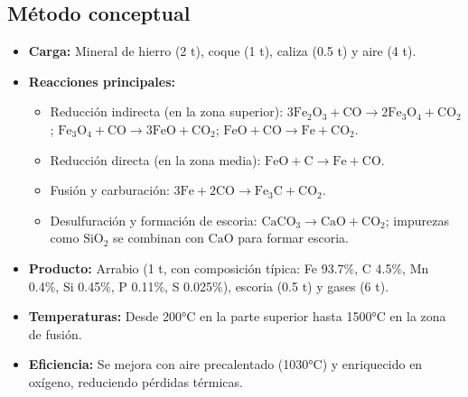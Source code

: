 \documentclass[12pt,a4paper]{article}
\begin{document}
\subsection{Método conceptual}
\begin{itemize}
\item \textbf{Carga:} Mineral de hierro (2 t), coque (1 t), caliza (0.5 t) y aire (4 t).
\item \textbf{Reacciones principales:}
\begin{itemize}
\item Reducción indirecta (en la zona superior): $3\mathrm{Fe}_2\mathrm{O}_3 + \mathrm{CO} \to 2\mathrm{Fe}_3\mathrm{O}_4 + \mathrm{CO}_2$; $\mathrm{Fe}_3\mathrm{O}_4 + \mathrm{CO} \to 3\mathrm{FeO} + \mathrm{CO}_2$; $\mathrm{FeO} + \mathrm{CO} \to \mathrm{Fe} + \mathrm{CO}_2$.
\item Reducción directa (en la zona media): $\mathrm{FeO} + \mathrm{C} \to \mathrm{Fe} + \mathrm{CO}$.
\item Fusión y carburación: $3\mathrm{Fe} + 2\mathrm{CO} \to \mathrm{Fe}_3\mathrm{C} + \mathrm{CO}_2$.
\item Desulfuración y formación de escoria: $\mathrm{CaCO}_3 \to \mathrm{CaO} + \mathrm{CO}_2$; impurezas como $\mathrm{SiO}_2$ se combinan con $\mathrm{CaO}$ para formar escoria.
\end{itemize}
\item \textbf{Producto:} Arrabio (1 t, con composición típica: Fe 93.7\%, C 4.5\%, Mn 0.4\%, Si 0.45\%, P 0.11\%, S 0.025\%), escoria (0.5 t) y gases (6 t).
\item \textbf{Temperaturas:} Desde 200°C en la parte superior hasta 1500°C en la zona de fusión.
\item \textbf{Eficiencia:} Se mejora con aire precalentado (1030°C) y enriquecido en oxígeno, reduciendo pérdidas térmicas.
\end{itemize}
\end{document}
